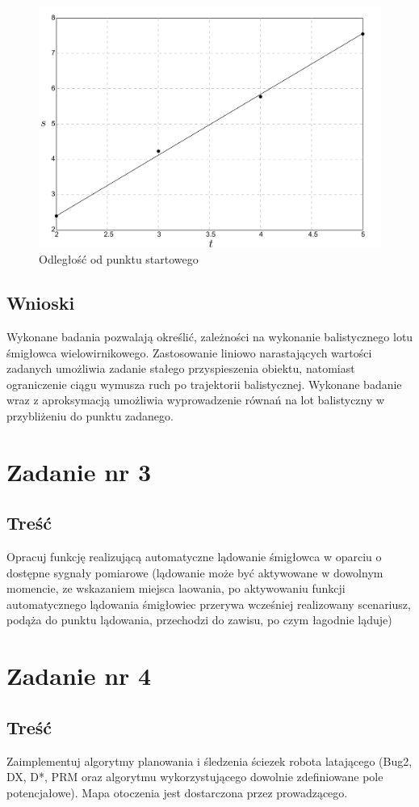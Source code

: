 \documentclass[polish,11pt,a4paper]{article}
\begin{document}
\begin{figure}[ht]
    \centering
    \includegraphics[width=0.7\linewidth]{paraboliczna/st.png}
    \caption{Odległość od punktu startowego}
    \label{fig:enter-label}
\end{figure}

\subsection*{Wnioski}
Wykonane badania pozwalają określić, zależności na wykonanie balistycznego lotu śmigłowca wielowirnikowego.
Zastosowanie liniowo narastających wartości zadanych umożliwia zadanie stałego przyspieszenia obiektu, natomiast
ograniczenie ciągu wymusza ruch po trajektorii balistycznej. Wykonane badanie wraz z aproksymacją umożliwia 
wyprowadzenie równań na lot balistyczny w przybliżeniu do punktu zadanego.

\section*{Zadanie nr 3}
\subsection*{Treść}
Opracuj funkcję realizującą automatyczne lądowanie śmigłowca w oparciu o dostępne 
sygnały pomiarowe (lądowanie może być aktywowane w dowolnym momencie, ze wskazaniem miejsca laowania,
po aktywowaniu funkcji automatycznego lądowania śmigłowiec przerywa wcześniej realizowany scenariusz,
podąża do punktu lądowania, przechodzi do zawisu, po czym łagodnie ląduje)

\section*{Zadanie nr 4}
\subsection*{Treść}
Zaimplementuj algorytmy planowania i śledzenia ściezek robota latającego
(Bug2, DX, D*, PRM oraz algorytmu wykorzystującego dowolnie zdefiniowane pole potencjałowe).
Mapa otoczenia jest dostarczona przez prowadzącego.
\end{document}
